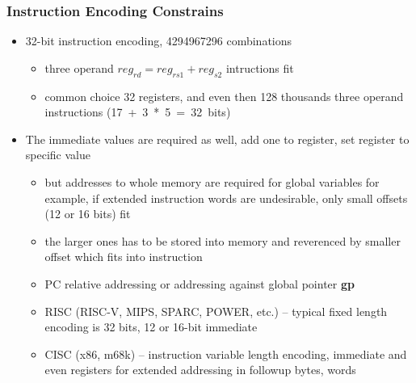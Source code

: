 \documentclass{beamer}
\begin{document}
\begin{frame}
\frametitle{Instruction Encoding Constrains}

\begin{itemize}

\item 32-bit instruction encoding, 4294967296 combinations
\begin{itemize}
\item three operand \texttt{$reg_{rd} = reg_{rs1} + reg_{s2}$} intructions fit
\item common choice 32 registers, and even then 128 thousands three operand instructions (17~+~3~*~5~=~32~bits)
\end{itemize}
\item The immediate values are required as well, add one to register, set register to specific value
\begin{itemize}
\item but addresses to whole memory are required for global variables for example, if extended instruction words are undesirable, only small offsets (12 or 16 bits) fit
\item the larger ones has to be stored into memory and reverenced by smaller offset which fits into instruction
\item PC relative addressing or addressing against global pointer \textbf{gp}
\item RISC (RISC-V, MIPS, SPARC, POWER, etc.) --  typical fixed length encoding is 32 bits, 12 or 16-bit immediate
\item CISC (x86, m68k) -- instruction variable length encoding, immediate and even registers for extended addressing in followup bytes, words
\end{itemize}
\end{itemize}
\end{frame}
\end{document}

